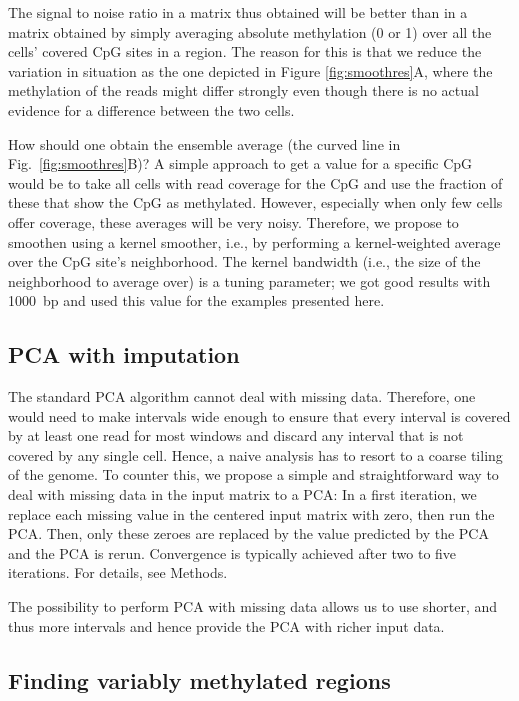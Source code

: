 \documentclass[twocolumn,10pt]{article}
\begin{document}
The signal to noise ratio in a matrix thus obtained will be better than in a matrix obtained by simply averaging absolute methylation (0 or 1) over all the cells' covered CpG sites in a region. The reason for this is that we reduce the variation in situation as the one depicted in Figure \ref{fig:smoothres}A, where the methylation of the reads might differ strongly even though there is no actual evidence for a difference between the two cells.

How should one obtain the ensemble average (the curved line in Fig.\ \ref{fig:smoothres}B)? A simple approach to get a value for a specific CpG would be to take all cells with read coverage for the CpG and use the fraction of these that show the CpG as methylated. However, especially when only few cells offer coverage, these averages will be very noisy. Therefore, we propose to smoothen using a kernel smoother, i.e., by performing a kernel-weighted average over the CpG site's neighborhood. The kernel bandwidth (i.e., the size of the neighborhood to average over) is a tuning parameter; we got good results with 1000~bp and used this value for the examples presented here.

\subsection{PCA with imputation}

The standard PCA algorithm cannot deal with missing data. Therefore, one would need to make intervals wide enough to ensure that every interval is covered by at least one read for most windows and discard any interval that is not covered by any single cell. Hence, a naive analysis has to resort to a coarse tiling of the genome. To counter this, we propose a simple and straightforward way to deal with missing data in the input matrix to a PCA: In a first iteration, we replace each missing value in the centered input matrix with zero, then run the PCA. Then, only these zeroes are replaced by the value predicted by the PCA and the PCA is rerun. Convergence is typically achieved after two to five iterations. For details, see Methods. 

The possibility to perform PCA with missing data allows us to use shorter, and thus more intervals and hence provide the PCA with richer input data.

\subsection{Finding variably methylated regions}
\end{document}
